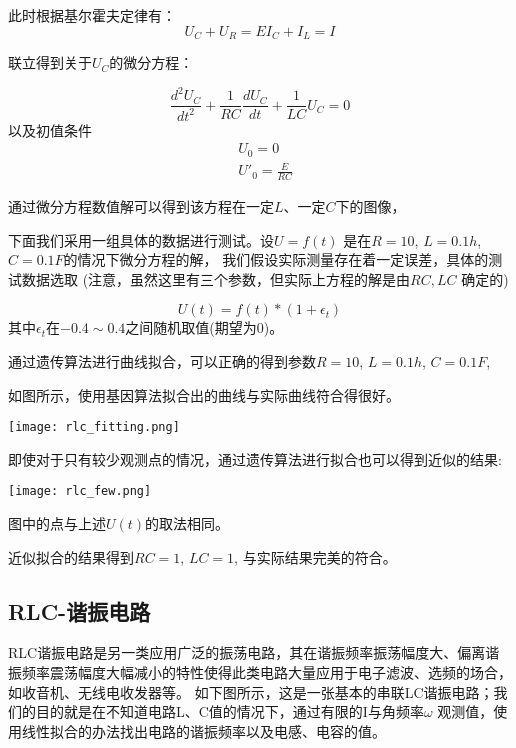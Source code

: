 \documentclass[a4paper]{article}
\begin{document}
此时根据基尔霍夫定律有：
\begin{equation}
U_C+U_R=E
I_C+I_L=I
\end{equation}

联立得到关于$U_C$的微分方程：

\begin{equation}
\frac{d^{2}U_C}{dt^{2}}+\frac{1}{RC}\frac{dU_C}{dt}+\frac{1}{LC}U_C=0
\end{equation}
以及初值条件
\begin{align}
	&U_0 = 0 \\
	&U'_0 = \frac{E}{RC}
\end{align}

通过微分方程数值解可以得到该方程在一定$L$、一定$C$下的图像，

下面我们采用一组具体的数据进行测试。设$U = f(t)$ 是在$R=10$, $L=0.1h$, $C = 0.1F$的情况下微分方程的解，
我们假设实际测量存在着一定误差，具体的测试数据选取
(注意，虽然这里有三个参数，但实际上方程的解是由$RC,LC$ 确定的)

\begin{equation}
	U(t) = f(t) * (1 + \epsilon_t)
\end{equation}
其中$\epsilon_t$在$-0.4 \sim 0.4$之间随机取值(期望为$0$)。

通过遗传算法进行曲线拟合，可以正确的得到参数$R=10$, $L = 0.1h$, $C = 0.1F$, 

如图所示，使用基因算法拟合出的曲线与实际曲线符合得很好。

\begin{center}
\texttt{[image: rlc\_fitting.png]}
\end{center}

即使对于只有较少观测点的情况，通过遗传算法进行拟合也可以得到近似的结果:

\begin{center}
	\texttt{[image: rlc\_few.png]}
\end{center}
图中的点与上述$U(t)$的取法相同。

近似拟合的结果得到$RC = 1$, $LC = 1$,
与实际结果完美的符合。

\subsection{RLC-谐振电路}

RLC谐振电路是另一类应用广泛的振荡电路，其在谐振频率振荡幅度大、偏离谐振频率震荡幅度大幅减小的特性使得此类电路大量应用于电子滤波、选频的场合，如收音机、无线电收发器等。
如下图所示，这是一张基本的串联LC谐振电路；我们的目的就是在不知道电路L、C值的情况下，通过有限的I与角频率$\omega$ 观测值，使用线性拟合的办法找出电路的谐振频率以及电感、电容的值。
\end{document}
